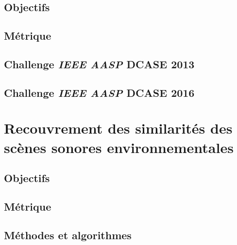 \subsection{Objectifs}
\label{sec:ch6_objASC}


\subsection{Métrique}
\label{sec:ch6_metriqueASC}

\subsection{Challenge \emph{IEEE AASP} DCASE 2013}
\label{sec:ch6_dcase2013ASC}

\subsection{Challenge \emph{IEEE AASP} DCASE 2016}
\label{sec:ch6_dcase2016ASC}

\section{Recouvrement des similarités des scènes sonores environnementales}
\label{sec:ch6_ASSR}

\subsection{Objectifs}
\label{sec:ch6_objASSR}


\subsection{Métrique}
\label{sec:ch6_metriqueASSR}

\subsection{Méthodes et algorithmes}
\label{sec:ch6_algoASSR}








